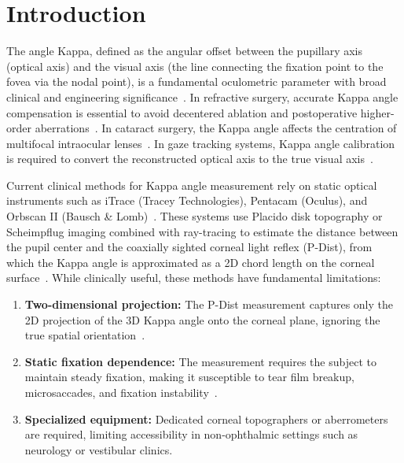 \documentclass[review,numbers,sort&compress]{elsarticle}
\begin{document}
\section{Introduction}

The angle Kappa, defined as the angular offset between the pupillary axis (optical axis) and the visual axis (the line connecting the fixation point to the fovea via the nodal point), is a fundamental oculometric parameter with broad clinical and engineering significance~\cite{Moshirfar2013,Park2012}. In refractive surgery, accurate Kappa angle compensation is essential to avoid decentered ablation and postoperative higher-order aberrations~\cite{Mrochen2001,Chan2006}. In cataract surgery, the Kappa angle affects the centration of multifocal intraocular lenses~\cite{Chang2016}. In gaze tracking systems, Kappa angle calibration is required to convert the reconstructed optical axis to the true visual axis~\cite{Liu2023}.

Current clinical methods for Kappa angle measurement rely on static optical instruments such as iTrace (Tracey Technologies), Pentacam (Oculus), and Orbscan II (Bausch \& Lomb)~\cite{Deng2022,Hashemi2010}. These systems use Placido disk topography or Scheimpflug imaging combined with ray-tracing to estimate the distance between the pupil center and the coaxially sighted corneal light reflex (P-Dist), from which the Kappa angle is approximated as a 2D chord length on the corneal surface~\cite{Pande1993}. While clinically useful, these methods have fundamental limitations:

\begin{enumerate}
    \item \textbf{Two-dimensional projection:} The P-Dist measurement captures only the 2D projection of the 3D Kappa angle onto the corneal plane, ignoring the true spatial orientation~\cite{Chang2014}.
    \item \textbf{Static fixation dependence:} The measurement requires the subject to maintain steady fixation, making it susceptible to tear film breakup, microsaccades, and fixation instability~\cite{Deng2022}.
    \item \textbf{Specialized equipment:} Dedicated corneal topographers or aberrometers are required, limiting accessibility in non-ophthalmic settings such as neurology or vestibular clinics.
\end{enumerate}
\end{document}
